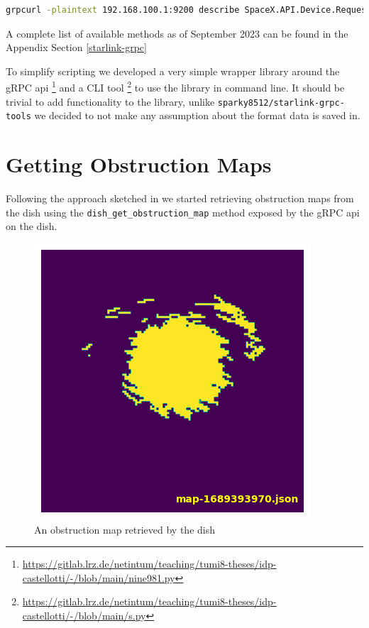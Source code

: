 \documentclass[IN,11pt,twoside,openright,bachelor,english]{tumthesis}
\begin{document}
\begin{lstlisting}[language=bash,basicstyle=\tiny]
grpcurl -plaintext 192.168.100.1:9200 describe SpaceX.API.Device.Request
\end{lstlisting}

A complete list of available methods as of September 2023 can be found in the Appendix Section \ref{starlink-grpc}

To simplify scripting we developed a very simple wrapper library around the gRPC api  \footnote{\url{https://gitlab.lrz.de/netintum/teaching/tumi8-theses/idp-castellotti/-/blob/main/nine981.py}} and a CLI tool \footnote{\url{https://gitlab.lrz.de/netintum/teaching/tumi8-theses/idp-castellotti/-/blob/main/s.py}} to use the library in command line. It should be trivial to add functionality to the library, unlike \texttt{sparky8512/starlink-grpc-tools} we decided to not make any assumption about the format data is saved in.

\section{Getting Obstruction Maps}

Following the approach sketched in \cite{izhikevich2023democratizing} we started retrieving obstruction maps from the dish using the \texttt{dish\_get\_obstruction\_map} method exposed by the gRPC api on the dish.

\begin{figure}	
	\centering
	\includegraphics[]{img/obstruction_map_finale.png}
	\caption{An obstruction map retrieved by the dish}
\end{figure}
\end{document}
